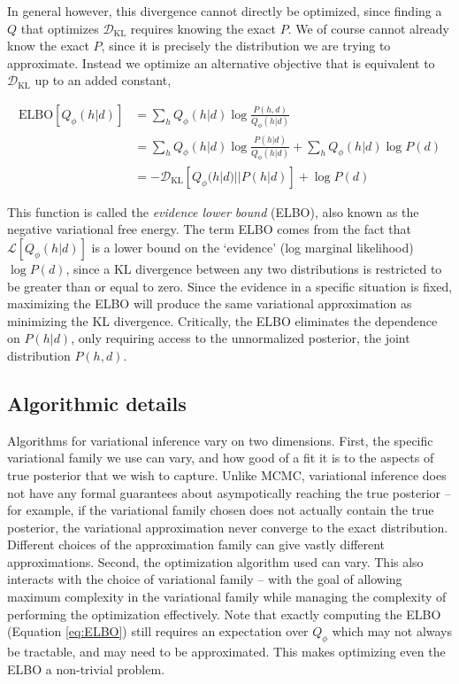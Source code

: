 In general however, this divergence cannot directly be optimized, since finding a $Q$ that optimizes $\mathcal{D}_{\text{KL}}$ requires knowing the exact $P$. We of course cannot already know the exact $P$, since it is precisely the distribution we are trying to approximate. Instead we optimize an alternative objective that is equivalent to $\mathcal{D}_{\text{KL}}$ up to an added constant,

\begin{align}
\text{ELBO}[Q_\phi(h|d)] &=  \sum_h Q_\phi(h|d) \log \frac{P(h,d)}{Q_\phi(h|d)}  \nonumber \\
& = \sum_h Q_\phi(h|d) \log \frac{P(h|d)}{Q_\phi(h|d)} + \sum_h Q_\phi(h|d) \log P(d)  \nonumber \\
& = - \mathcal{D}_{\text{KL}}[Q_\phi(h|d)||P(h|d)]  + \log P(d)
\label{eq:ELBO}
\end{align}

This function is called the \emph{evidence lower bound} (ELBO), also known as the negative variational free energy. The term ELBO comes from the fact that $\mathcal{L}[Q_\phi(h|d)]$ is a lower bound on the `evidence' (log marginal likelihood) $\log P(d)$, since a KL divergence between any two distributions is restricted to be greater than or equal to zero. Since the evidence in a specific situation is fixed, maximizing the ELBO will produce the same variational approximation as minimizing the KL divergence. Critically, the ELBO eliminates the dependence on $P(h|d)$, only requiring access to the unnormalized posterior, the joint distribution $P(h,d)$.


\subsection{Algorithmic details}
\label{sec:var_alg}

Algorithms for variational inference vary on two dimensions. First, the specific variational family we use can vary, and how good of a fit it is to the aspects of true posterior that we wish to capture. Unlike MCMC, variational inference does not have any formal guarantees about asympotically reaching the true posterior -- for example, if the variational family chosen does not actually contain the true posterior, the variational approximation never converge to the exact distribution. Different choices of the approximation family can give vastly different approximations. Second, the optimization algorithm used can vary. This also interacts with the choice of variational family -- with the goal of allowing maximum complexity in the variational family while managing the complexity of performing the optimization effectively. Note that exactly computing the ELBO (Equation \ref{eq:ELBO}) still requires an expectation over $Q_\phi$ which may not always be tractable, and may need to be approximated. This makes optimizing even the ELBO a non-trivial problem.

